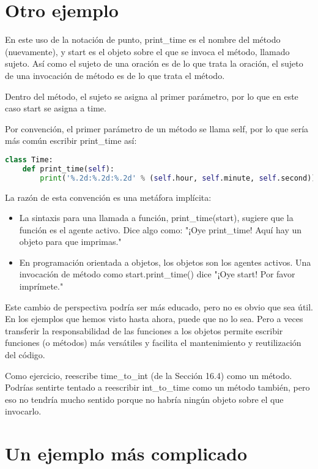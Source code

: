 \section{Otro ejemplo}

En este uso de la notación de punto, print\_time es el nombre del método (nuevamente), y start es el objeto sobre el que se invoca el método, llamado sujeto. Así como el sujeto de una oración es de lo que trata la oración, el sujeto de una invocación de método es de lo que trata el método.

Dentro del método, el sujeto se asigna al primer parámetro, por lo que en este caso start se asigna a time.

Por convención, el primer parámetro de un método se llama self, por lo que sería más común escribir print\_time así:

\begin{lstlisting}[language=Python]
class Time:
    def print_time(self):
        print('%.2d:%.2d:%.2d' % (self.hour, self.minute, self.second))
\end{lstlisting}

La razón de esta convención es una metáfora implícita:

\begin{itemize}
\item La sintaxis para una llamada a función, print\_time(start), sugiere que la función es el agente activo. Dice algo como: "¡Oye print\_time! Aquí hay un objeto para que imprimas."
\item En programación orientada a objetos, los objetos son los agentes activos. Una invocación de método como start.print\_time() dice "¡Oye start! Por favor imprímete."
\end{itemize}

Este cambio de perspectiva podría ser más educado, pero no es obvio que sea útil. En los ejemplos que hemos visto hasta ahora, puede que no lo sea. Pero a veces transferir la responsabilidad de las funciones a los objetos permite escribir funciones (o métodos) más versátiles y facilita el mantenimiento y reutilización del código.

Como ejercicio, reescribe time\_to\_int (de la Sección 16.4) como un método. Podrías sentirte tentado a reescribir int\_to\_time como un método también, pero eso no tendría mucho sentido porque no habría ningún objeto sobre el que invocarlo.

\section{Un ejemplo más complicado}

